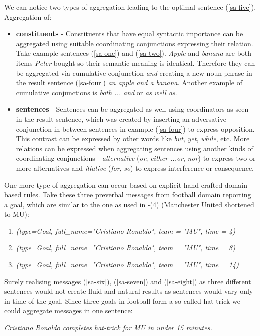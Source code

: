 We can notice two types of aggregation leading to the optimal sentence (\ref{sa-five}). Aggregation of:
\begin{itemize}
	\item \textbf{constituents} - Constituents that have equal syntactic importance can be aggregated using suitable coordinating conjunctions expressing their relation. Take example sentences (\ref{sa-one}) and (\ref{sa-two}). \emph{Apple} and \emph{banana} are both items \emph{Peter} bought so their semantic meaning is identical. Therefore they can be aggregated via cumulative conjunction \emph{and} creating a new noun phrase in the result sentence (\ref{sa-four}) \emph{an apple and a banana}. Another example of cumulative conjunctions is \emph{both ... and} or \emph{as well as}.
	\item \textbf{sentences} - Sentences can be aggregated as well using coordinators as seen in the result sentence, which was created by inserting an adversative conjunction in between sentences in example (\ref{sa-four}) to express opposition. This contrast can be expressed by other words like \emph{but}, \emph{yet}, \emph{while}, etc. More relations can be expressed when aggregating sentences using another kinds of coordinating conjunctions - \emph{alternative} (\emph{or}, \emph{either ...or}, \emph{nor}) to express two or more alternatives and \emph{illative} (\emph{for}, \emph{so}) to express interference or consequence.
\end{itemize}

One more type of aggregation can occur based on explicit hand-crafted domain-based rules. Take these three preverbal messages from football domain reporting a goal, which are similar to the one as used in -(4) (Manchester United shortened to MU):
\begin{enumerate}[resume]
	\item \emph{(type=Goal, full\_name="Cristiano Ronaldo", team = "MU", time = 4)}\label{sa-six}	
	\item \emph{(type=Goal, full\_name="Cristiano Ronaldo", team = "MU", time = 8)}\label{sa-seven}
	\item \emph{(type=Goal, full\_name="Cristiano Ronaldo", team = "MU", time = 14)}\label{sa-eight}	
\end{enumerate}

Surely realising messages (\ref{sa-six}), (\ref{sa-seven}) and (\ref{sa-eight}) as three different sentences would not create fluid and natural results as sentences would vary only in time of the goal. Since three goals in football form a so called hat-trick we could aggregate messages in one sentence:
\begin{center}
	\emph{Cristiano Ronaldo completes hat-trick for MU in under 15 minutes.}
\end{center}

